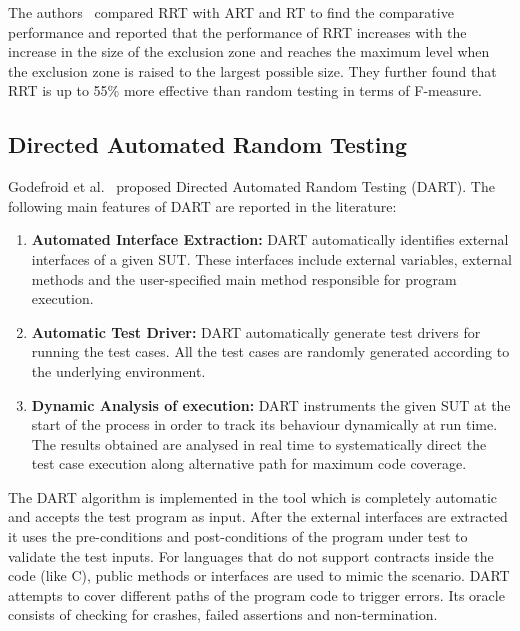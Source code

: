 The authors~\cite{chan2003normalized} compared RRT with ART and RT to find the comparative performance and reported that the performance of RRT increases with the increase in the size of the exclusion zone and reaches the maximum level when the exclusion zone is raised to the largest possible size. %
They further found that RRT is up to 55\% more effective than random testing in terms of F-measure.



\subsection{Directed Automated Random Testing}
Godefroid et al.~\cite{godefroid2005dart} proposed Directed Automated Random Testing (DART). %
The following main features of DART are reported in the literature:
\begin{enumerate}
\item {\bf Automated Interface Extraction:} DART automatically identifies external interfaces of a given SUT. These interfaces include external variables, external methods and the user-specified main method responsible for program execution.
\item {\bf Automatic Test Driver:} DART automatically generate test drivers for running the test cases. All the test cases are randomly generated according to the underlying environment.
\item {\bf Dynamic Analysis of execution:} DART instruments the given SUT at the start of the process in order to track its behaviour dynamically at run time. The results obtained are analysed in real time to systematically direct the test case execution along alternative path for maximum code coverage.
\end{enumerate}

The DART algorithm is implemented in the tool which is completely automatic and accepts the test program as input. After the external interfaces are extracted it uses the pre-conditions and post-conditions of the program under test to validate the test inputs. For languages that do not support contracts inside the code (like C), public methods or interfaces are used to mimic the scenario. DART attempts to cover different paths of the program code to trigger errors. Its oracle consists of checking for crashes, failed assertions and non-termination.



